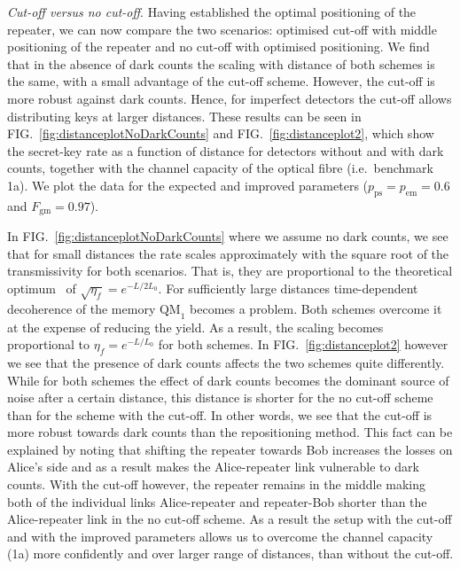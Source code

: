 \documentclass[aps,pra,reprint,superscriptaddress]{revtex4-1}
\begin{document}
\smallskip
\textit{Cut-off versus no cut-off}. Having established the optimal positioning of the repeater, we can now compare the two scenarios: optimised cut-off with middle positioning of the repeater and no cut-off with optimised positioning. We find that in the absence of dark counts the scaling with distance of both schemes is the same, with a small advantage of the cut-off scheme. However, the cut-off is more robust against dark counts. Hence, for imperfect detectors the cut-off allows distributing keys at larger distances. These results can be seen in FIG.~\ref{fig:distanceplotNoDarkCounts} and FIG.~\ref{fig:distanceplot2}, which show the secret-key rate as a function of distance for detectors without and with dark counts, together with the channel capacity of the optical fibre (i.e.~benchmark 1a). We plot the data for the expected and improved parameters ($p_{\textrm{ps}} = p_{\textrm{em}} = 0.6$ and $F_{\textrm{gm}} = 0.97$). 

In FIG.~\ref{fig:distanceplotNoDarkCounts} where we assume no dark counts, we see that for small distances the rate scales approximately with the square root of the transmissivity for both scenarios. That is, they are proportional to the theoretical optimum~\cite{luong2015overcoming} of $\sqrt{\eta_f} = e^{-L/2L_0}$. For sufficiently large distances time-dependent decoherence of the memory $\textrm{QM}_1$ becomes a problem. Both schemes overcome it at the expense of reducing the yield. As a result, the scaling becomes proportional to $\eta_f = e^{-L/L_0}$ for both schemes. In FIG.~\ref{fig:distanceplot2} however we see that the presence of dark counts affects the two schemes quite differently. While for both schemes the effect of dark counts becomes the dominant source of noise after a certain distance, this distance is shorter for the no cut-off scheme than for the scheme with the cut-off. In other words, we see that the cut-off is more robust towards dark counts than the repositioning method. This fact can be explained by noting that shifting the repeater towards Bob increases the losses on Alice's side and as a result makes the Alice-repeater link vulnerable to dark counts. With the cut-off however, the repeater remains in the middle making both of the individual links Alice-repeater and repeater-Bob shorter than the Alice-repeater link in the no cut-off scheme. As a result the setup with the cut-off and with the improved parameters allows us to overcome the channel capacity (1a) more confidently and over larger range of distances, than without the cut-off. 
\end{document}
